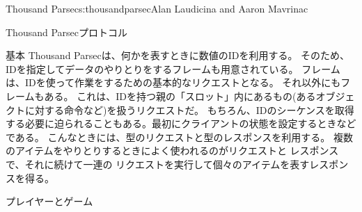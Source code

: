 \begin{aosachapter}{Thousand Parsec}{s:thousandparsec}{Alan Laudicina and Aaron Mavrinac}
\begin{aosasect1}{Thousand Parsecプロトコル}
\begin{aosasect2}{基本}
Thousand Parsecは、何かを表すときに数値のIDを利用する。
そのため、IDを指定してデータのやりとりをするフレームも用意されている。
フレームは、IDを使って作業をするための基本的なリクエストとなる。
それ以外にもフレームもある。
これは、IDを持つ親の「スロット」内にあるもの(あるオブジェクトに対する命令など)を扱うリクエストだ。
もちろん、IDのシーケンスを取得する必要に迫られることもある。最初にクライアントの状態を設定するときなどである。
こんなときには、型のリクエストと型のレスポンスを利用する。
複数のアイテムをやりとりするときによく使われるのがリクエストと
レスポンスで、それに続けて一連の
リクエストを実行して個々のアイテムを表すレスポンスを得る。

\end{aosasect2}

\begin{aosasect2}{プレイヤーとゲーム}


\end{aosasect2}
\end{aosasect1}
\end{aosachapter}
